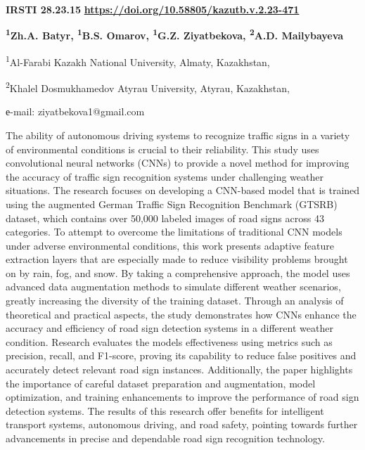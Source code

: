 \newpage
{}
{\bfseries IRSTI 28.23.15}
\hfill {\bfseries \href{https://doi.org/10.58805/kazutb.v.2.23-471}{https://doi.org/10.58805/kazutb.v.2.23-471}}


\begin{center}
{\bfseries \textsuperscript{1}Zh.A. Batyr, \textsuperscript{1}B.S. Omarov,
\textsuperscript{1}G.Z. Ziyatbekova\envelope, \textsuperscript{2}A.D.
Mailybayeva}

\textsuperscript{1}Al-Farabi Kazakh National University, Almaty,
Kazakhstan,

\textsuperscript{2}Khalel Dosmukhamedov Atyrau University, Atyrau,
Kazakhstan,

е-mail: ziyatbekova1@gmail.com
\end{center}

The ability of autonomous driving systems to recognize traffic signs in
a variety of environmental conditions is crucial to their reliability.
This study uses convolutional neural networks (CNNs) to provide a novel
method for improving the accuracy of traffic sign recognition systems
under challenging weather situations. The research focuses on developing
a CNN-based model that is trained using the augmented German Traffic
Sign Recognition Benchmark (GTSRB) dataset, which contains over 50,000
labeled images of road signs across 43 categories. To attempt to
overcome the limitations of traditional CNN models under adverse
environmental conditions, this work presents adaptive feature extraction
layers that are especially made to reduce visibility problems brought on
by rain, fog, and snow. By taking a comprehensive approach, the model
uses advanced data augmentation methods to simulate different weather
scenarios, greatly increasing the diversity of the training dataset.
Through an analysis of theoretical and practical aspects, the study
demonstrates how CNNs enhance the accuracy and efficiency of road sign
detection systems in a different weather condition. Research evaluates
the model\textquotesingle s effectiveness using metrics such as
precision, recall, and F1-score, proving its capability to reduce false
positives and accurately detect relevant road sign instances.
Additionally, the paper highlights the importance of careful dataset
preparation and augmentation, model optimization, and training
enhancements to improve the performance of road sign detection systems.
The results of this research offer benefits for intelligent transport
systems, autonomous driving, and road safety, pointing towards further
advancements in precise and dependable road sign recognition technology.


